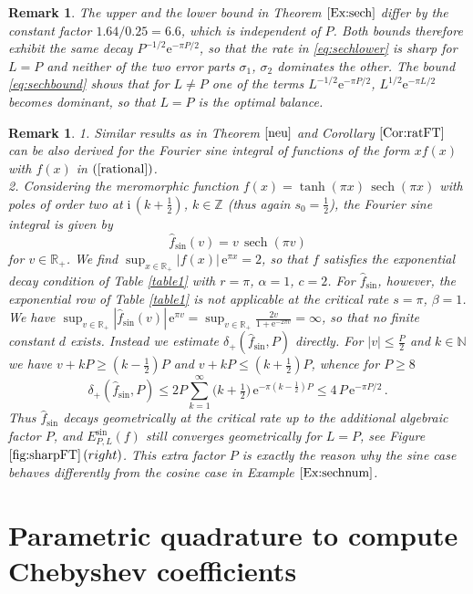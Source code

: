 \documentclass[11pt,a4paper]{scrartcl}
\newtheorem{remark}[theorem]{Remark}
\numberwithin{equation}{section}
\numberwithin{table}{section}
\numberwithin{figure}{section}
\newcommand{\e}{\mathrm e}
\renewcommand{\i}{\mathrm i}
\newcommand{\Z}{\mathbb Z}
\newcommand{\N}{\mathbb N}
\newcommand{\Rp}{{\mathbb R}_{+}}
\newcommand{\fsin}{{\hat f}_{\sin}}
\newcommand{\dpl}{\delta_{+}}
\newcommand{\Esin}{E^{\sin}}
\begin{document}
\begin{remark}\label{rem:balance}
The upper and the lower bound in Theorem $\ref{Ex:sech}$ differ by the constant factor
$1.64/0.25 = 6.6$, which is independent of $P$. Both bounds therefore exhibit the same decay
$P^{-1/2}\e^{-\pi P/2}$, so that the rate in \eqref{eq:sechlower} is sharp for $L=P$ and neither of
the two error parts $\sigma_1$, $\sigma_2$ dominates the other. The bound \eqref{eq:sechbound}
shows that for $L \ne P$ one of the terms $L^{-1/2}\e^{-\pi P/2}$, $L^{1/2}\e^{-\pi L/2}$ becomes
dominant, so that $L=P$ is the optimal balance.
\end{remark}

\begin{remark}\label{rem-sinus}
1. Similar results as in Theorem $\ref{neu}$ and Corollary $\ref{Cor:ratFT}$ can be also derived for the Fourier sine integral of functions of the form $x f(x)$ with $f(x)$ in $(\ref{rational})$.\\
2. Considering  the meromorphic function $f(x) = \tanh(\pi x)\,\operatorname{sech}(\pi x)$ with poles of order two at $\i\,(k+\tfrac12)$, $k \in \Z$ (thus again $s_0 = \tfrac12$),
 the Fourier sine integral  is given by
 $$ \textstyle \fsin(v) = v\,\operatorname{sech}(\pi v)$$
 for  $v \in \Rp$.
We find  $\sup_{x\in\Rp} |f(x)|\,\e^{\pi x} = 2$, so that $f$ satisfies the exponential decay
condition of Table  \textnormal{\ref{table1}} with $r = \pi$, $\alpha=1$, $c=2$.
For $\fsin$, however, the exponential row of Table  \textnormal{\ref{table1}} is \emph{not} applicable at the
critical rate $s=\pi$, $\beta=1$.  We have
$\sup_{v\in\Rp}|\fsin(v)|\,\e^{\pi v} = \sup_{v\in\Rp}\frac{2v}{1+\e^{-2\pi v}} = \infty$,
so that no finite constant $d$ exists. Instead we estimate $\dpl(\fsin,P)$ directly. For
$|v| \le \frac P2$ and $k \in \N$ we have $v + kP \ge (k-\frac12)P$ and $v+kP \le (k+\frac12)P$,
whence for $P \ge 8$
$$
\textstyle \dpl(\fsin,P) \le 2P \sum\limits_{k=1}^{\infty}\big(k+\tfrac12\big)\,\e^{-\pi(k-\frac12)P}
\le 4\,P\,\e^{-\pi P/2}\,.
$$
Thus $\fsin$ decays geometrically at the critical rate up to the additional algebraic factor $P$,
and $\Esin_{P,L}(f)$ still converges geometrically for $L = P$, see
Figure~$\ref{fig:sharpFT}\,(right)$. This extra factor $P$ is exactly the reason why the sine case
behaves differently from the cosine case in Example $\ref{Ex:sechnum}$.
\end{remark}

\section{Parametric quadrature to compute Chebyshev coefficients\label{sec:cheb}}
\end{document}
